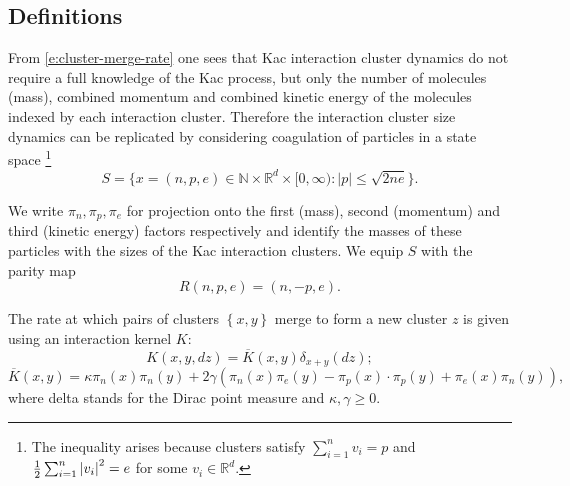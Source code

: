 \subsection{Definitions}
From \eqref{e:cluster-merge-rate} one sees that Kac interaction cluster dynamics do not require a full knowledge of the Kac process, but only the number of molecules (mass), combined momentum and combined kinetic energy of the molecules indexed by each interaction cluster.
Therefore the interaction cluster size dynamics can be replicated by considering coagulation of particles in a state space
\footnote{The inequality arises because clusters satisfy $\sum_{i=1}^n v_i = p$ and $\frac12 \sum_{i=1}^n \left\lvert{v_i}\right\rvert^2 = e$ for some $v_i \in \mathbb{R}^d$.}
\begin{equation}
    S=\{x=(n, p, e) \in \mathbb{N}\times \mathbb{R}^d\times [0,\infty): |p|\leq \sqrt{2ne} \}.
\end{equation}

We write $\pi_n, \pi_p, \pi_e$ for projection onto the first (mass), second (momentum) and third (kinetic energy) factors respectively and identify the masses of these particles with the sizes of the Kac interaction clusters. We equip $S$ with the parity map \begin{equation*}
    R(n,p,e)=(n,-p,e).
\end{equation*}


The rate at which pairs of clusters $\left\{ x,y \right\}$ merge to form a new cluster $z$ is given using an interaction kernel $K$:
\begin{equation}\label{eq: smoluchowski kernel}
    K(x,y,dz)=\overline{K}(x,y)\delta_{x+y}(dz);
    \end{equation} \begin{equation} \overline{K}(x,y)=\kappa \pi_n(x)\pi_n(y)+2\gamma\left(\pi_n(x)\pi_e(y)-\pi_p(x)\cdot \pi_p(y)+\pi_e(x)\pi_n(y)\right),
\end{equation}
where delta stands for the Dirac point measure and $\kappa, \gamma\ge 0$.

